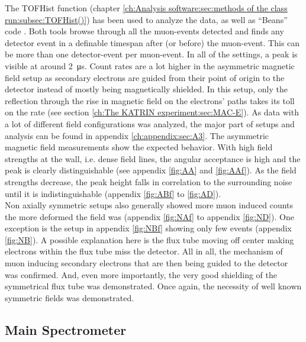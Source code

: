   	
  The TOFHist function (chapter \ref{ch:Analysis software:sec:methods of the class run:subsec:TOFHist()}) has been used to analyze the data, as well as ``Beans'' code \cite{sanshiro}.
  Both tools browse through all the muon-events detected and finds any detector event in a definable timespan after (or before) the muon-event. This can be more than one detector-event per muon-event. In all of the settings, a peak is visible at around \SI{2}{\micro\second}. Count rates are a lot higher in the asymmetric magnetic field setup as secondary electrons are guided from their point of origin to the detector instead of mostly being magnetically shielded. In this setup, only the reflection through the rise in magnetic field on the electrons' paths takes its toll on the rate (see section \ref{ch:The KATRIN experiment:sec:MAC-E}).
  As data with a lot of different field configurations was analyzed, the major part of setups and analysis can be found in appendix \ref{ch:appendix:sec:A3}.
  The asymmetric magnetic field measurements show the expected behavior. With high field strengths at the wall, i.e. dense field lines, the angular acceptance is high and the peak is clearly distinguishable (see appendix \ref{fig:AA} and \ref{fig:AAf}). As the field strengths decrease, the peak height falls in correlation to the surrounding noise until it is indistinguishable (appendix \ref{fig:ABf} to \ref{fig:AD}).\\
  Non axially symmetric setups also generally showed more muon induced counts the more deformed the field was (appendix \ref{fig:NAf} to appendix \ref{fig:ND}). One exception is the setup in appendix \ref{fig:NBf} showing only few events (appendix \ref{fig:NB}). A possible explanation here is the flux tube moving off center making electrons within the flux tube miss the detector.
  All in all, the mechanism of muon inducing secondary electrons that are then being guided to the detector was confirmed. And, even more importantly, the very good shielding of the symmetrical flux tube was demonstrated. Once again, the necessity of well known symmetric fields was demonstrated.
  
  
  \subsection{Main Spectrometer}
  \label{ch:Analysis:sec:Monitor Spectrometer Measurements:subsec:Main Spectrometer}
  
